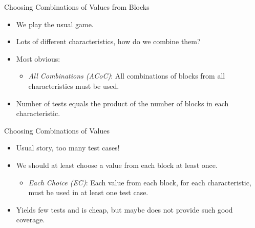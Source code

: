 \documentclass{beamer}
\begin{document}
\begin{frame}{Choosing Combinations of Values from Blocks}
  
  \begin{itemize}
  \item We play the usual game.
  \item Lots of different characteristics, how do we combine them?
  \item Most obvious:
    \begin{itemize}
    \item {\em All Combinations (ACoC)}: All combinations of blocks from all
      characteristics must be used.
    \end{itemize}
  \item Number of tests equals the product of the number of blocks in each
    characteristic. 
  \end{itemize}
  \end{frame}
\begin{frame}{Choosing Combinations of Values}
  \begin{itemize}
  \item Usual story, too many test cases!
  \item We should at least choose a value from each block at least once.
    \begin{itemize}
    \item {\em Each Choice (EC)}: Each value from each block, for each
      characteristic, must be used in at least one test case.
    \end{itemize}
  \item Yields few tests and is cheap, but maybe does not provide such
    good coverage.
  \end{itemize}
\end{frame}
\end{document}
